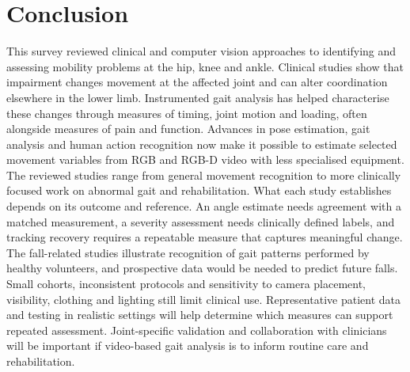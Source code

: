 \documentclass[12pt,nopreprintline]{elsarticle}
\begin{document}


\section{Conclusion}
\label{sec:conclusion}
\begin{revision}
This survey reviewed clinical and computer vision approaches to identifying and assessing mobility problems at the hip, knee and ankle. Clinical studies show that impairment changes movement at the affected joint and can alter coordination elsewhere in the lower limb. Instrumented gait analysis has helped characterise these changes through measures of timing, joint motion and loading, often alongside measures of pain and function. Advances in pose estimation, gait analysis and human action recognition now make it possible to estimate selected movement variables from RGB and RGB-D video with less specialised equipment. The reviewed studies range from general movement recognition to more clinically focused work on abnormal gait and rehabilitation. What each study establishes depends on its outcome and reference. An angle estimate needs agreement with a matched measurement, a severity assessment needs clinically defined labels, and tracking recovery requires a repeatable measure that captures meaningful change. The fall-related studies illustrate recognition of gait patterns performed by healthy volunteers, and prospective data would be needed to predict future falls. Small cohorts, inconsistent protocols and sensitivity to camera placement, visibility, clothing and lighting still limit clinical use. Representative patient data and testing in realistic settings will help determine which measures can support repeated assessment. Joint-specific validation and collaboration with clinicians will be important if video-based gait analysis is to inform routine care and rehabilitation.
\end{revision}
\begingroup\small


\endgroup
\end{document}
